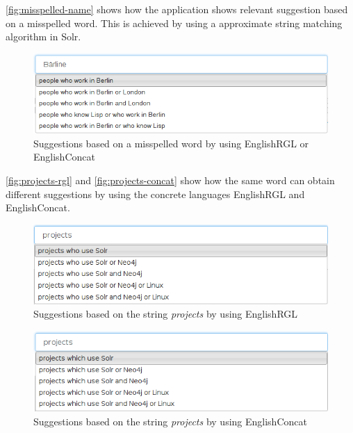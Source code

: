 \autoref{fig:misspelled-name} shows how the application shows relevant suggestion based on a misspelled word. This is achieved by using a approximate string matching algorithm in Solr.

\begin{figure}[H]
\includegraphics[scale=0.6,keepaspectratio,valign=t]{./gfx/misspelled_name.png}
\caption{Suggestions based on a misspelled word by using EnglishRGL or EnglishConcat\label{fig:misspelled-name}}
\end{figure}

\autoref{fig:projects-rgl} and \autoref{fig:projects-concat} show how the same word can obtain different suggestions by using the concrete languages EnglishRGL and EnglishConcat.

\begin{figure}[H]
\includegraphics[scale=0.6,keepaspectratio,valign=t]{./gfx/projects-rgl.png}
\caption{Suggestions based on the string \emph{projects} by using EnglishRGL\label{fig:projects-rgl}}
\end{figure}

\begin{figure}[H]
\includegraphics[scale=0.6,keepaspectratio,valign=t]{./gfx/projects-concat.png}
\caption{Suggestions based on the string \emph{projects} by using EnglishConcat\label{fig:projects-concat}}
\end{figure}

